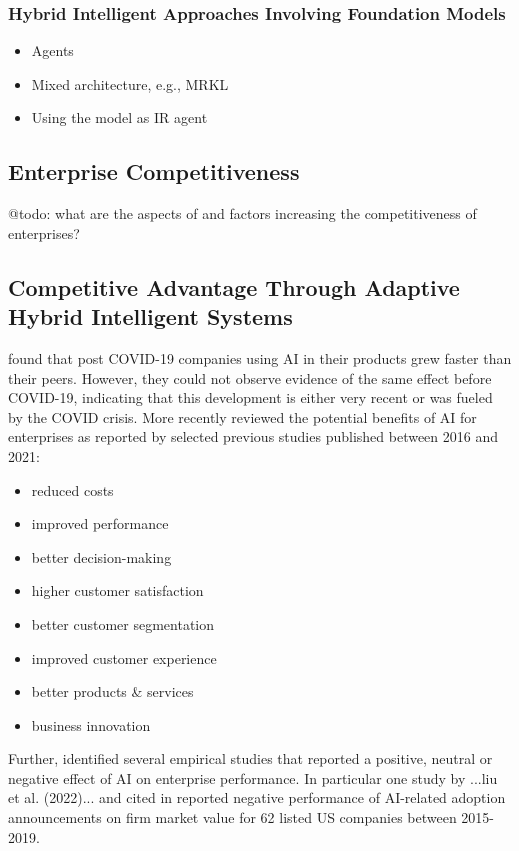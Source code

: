 \subsubsection{Hybrid Intelligent Approaches Involving Foundation Models}

\begin{itemize}
    \item Agents 
    \item Mixed architecture, e.g., MRKL
    \item Using the model as IR agent 
\end{itemize}





\subsection{Enterprise Competitiveness}

{\color{purple} @todo: what are the aspects of and factors increasing the competitiveness of enterprises?}


\subsection{Competitive Advantage Through Adaptive Hybrid Intelligent Systems}

\cite{xuCanArtificialIntelligence2021} found that post COVID-19 companies using AI in their products grew
faster than their peers. However, they could not observe evidence of the same effect before COVID-19, indicating
that this development is either very recent or was fueled by the COVID crisis. More recently
\cite{hoArtificialIntelligenceFirm2022} reviewed the potential benefits of AI for enterprises as reported
by selected previous studies published between 2016 and 2021:

\begin{itemize}
    \item reduced costs
    \item improved performance
    \item better decision-making
    \item higher customer satisfaction
    \item better customer segmentation
    \item improved customer experience
    \item better products \& services
    \item business innovation
\end{itemize}

Further, \cite{hoArtificialIntelligenceFirm2022} identified several empirical studies that reported a positive,
neutral or negative effect of AI on enterprise performance. In particular one study by ...liu et al. (2022)...
and cited in \cite{hoArtificialIntelligenceFirm2022} reported negative performance of AI-related adoption 
announcements on firm market value for 62 listed US companies between 2015-2019.
